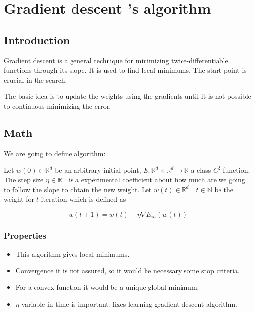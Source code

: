 

\section{ Gradient descent 's algorithm }
\subsection{Introduction}

Gradient descent is a general technique for minimizing  twice-differentiable functions through its slope. \cite{LFD}
It is used to find local minimums. The start point is crucial in the search.  

The basic idea is to update the weights using the gradients until it is not possible to continuous minimizing the error.


\medskip

\subsection{Math}

We are going to define  algorithm:

Let $w(0) \in \mathbb{R}^d$ be an arbitrary initial point,
$E : \mathbb{R}^d \times \mathbb{R}^d \longrightarrow \mathbb R$
a class $C^2$ function. The step size $\eta \in \mathbb{R}^+$
is a experimental coefficient about how much are we going to follow the slope to obtain the new weight.  
Let  $w(t) \in \mathbb{R}^d  \quad t \in \mathbb N$ be the weight for $t$ iteration which is defined as

\begin{equation*}
  w(t+1) = w(t) - \eta \nabla E_{in}(w(t))
\end{equation*}

\subsubsection{ Properties}

\begin{itemize}
\item This algorithm gives local minimums.
\item Convergence it is not assured, so it would be necessary some stop criteria. 
\item For a convex function it would be a unique global minimum.
\item $\eta$ variable in time  is important: fixes learning gradient descent algorithm. 
\end{itemize}


